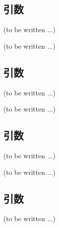 \subsection{引数\TBW}
(to be written ...)



(to be written ...)


\subsection{引数\TBW}
(to be written ...)



(to be written ...)


\subsection{引数\TBW}
(to be written ...)



(to be written ...)


\subsection{引数\TBW}
(to be written ...)



